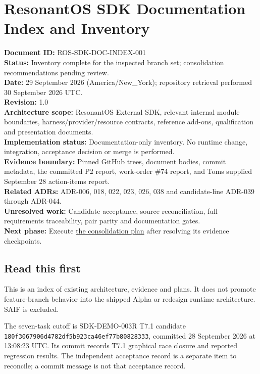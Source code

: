 \documentclass[
  10pt,
]{article}
\author{}
\date{}
\begin{document}
\hypertarget{resonantos-sdk-documentation-index-and-inventory}{%
\section{ResonantOS SDK Documentation Index and
Inventory}\label{resonantos-sdk-documentation-index-and-inventory}}

\textbf{Document ID:} ROS-SDK-DOC-INDEX-001\\
\textbf{Status:} Inventory complete for the inspected branch set;
consolidation recommendations pending review.\\
\textbf{Date:} 29 September 2026 (America/New\_York); repository
retrieval performed 30 September 2026 UTC.\\
\textbf{Revision:} 1.0\\
\textbf{Architecture scope:} ResonantOS External SDK, relevant internal
module boundaries, harness/provider/resource contracts, reference
add-ons, qualification and presentation documents.\\
\textbf{Implementation status:} Documentation-only inventory. No runtime
change, integration, acceptance decision or merge is performed.\\
\textbf{Evidence boundary:} Pinned GitHub trees, document bodies, commit
metadata, the committed P2 report, work-order \#74 report, and
Tom\textquotesingle s supplied September 28 action-items report.\\
\textbf{Related ADRs:} ADR-006, 018, 022, 023, 026, 038 and
candidate-line ADR-039 through ADR-044.\\
\textbf{Unresolved work:} Candidate acceptance, source reconciliation,
full requirements traceability, pair parity and documentation gates.\\
\textbf{Next phase:} Execute
\href{SDK-DOCUMENTATION-CONSOLIDATION-PLAN.md}{the consolidation plan}
after resolving its evidence checkpoints.

\hypertarget{read-this-first}{%
\subsection{Read this first}\label{read-this-first}}

This is an index of existing architecture, evidence and plans. It does
not promote feature-branch behavior into the shipped Alpha or redesign
runtime architecture. SAIF is excluded.

The seven-task cutoff is SDK-DEMO-003R T7.1 candidate
\nolinkurl{180f3067906d4782df5b923ca46ef77b80828333}, committed 28
September 2026 at 13:08:23 UTC. Its commit records T7.1 graphical race
closure and reported regression results. The independent acceptance
record is a separate item to reconcile; a commit message is not that
acceptance record.
\end{document}
